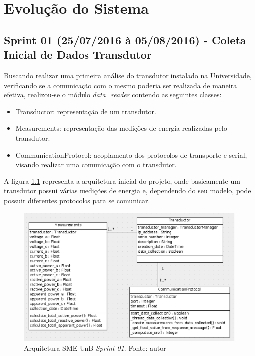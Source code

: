 \chapter{Evolução do Sistema}

\section{Sprint 01 (25/07/2016 à 05/08/2016) - Coleta Inicial de Dados Transdutor}
Buscando realizar uma primeira análise do transdutor instalado na Universidade, verificando se a comunicação com o mesmo poderia ser realizada de maneira efetiva, realizou-se o módulo \textit{data\_reader} contendo as seguintes classes:
\begin{itemize}
    \item Transductor: representação de um transdutor.
    \item Measurements: representação das medições de energia realizadas pelo transdutor.
    \item CommunicationProtocol: acoplamento dos protocolos de transporte e serial, visando realizar uma comunicação com o transdutor.
\end{itemize}

A figura \ref{sprint01arq} representa a arquitetura inicial do projeto, onde basicamente um transdutor possui várias medições de energia e, dependendo do seu modelo, pode possuir diferentes protocolos para se comunicar.

\begin{figure}[!htpb]
    \centering
    \includegraphics[keepaspectratio=true,scale=0.6]{figuras/sprint01arq.eps}
    \caption{Arquitetura SME-UnB \textit{Sprint 01}. Fonte: autor}
    \label{sprint01arq}
\end{figure}

